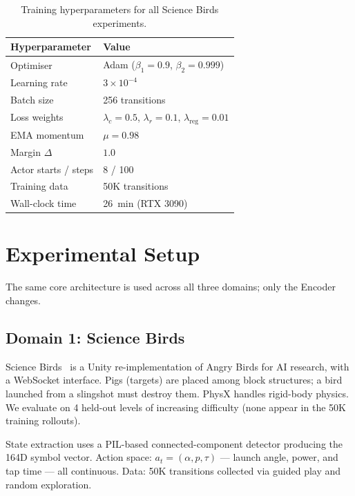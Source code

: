 \documentclass[10pt,twocolumn]{article}
\begin{document}
\begin{table}[h]
\centering
\small
\setlength{\tabcolsep}{5pt}
\begin{tabular}{ll}
\toprule
Hyperparameter & Value \\
\midrule
Optimiser & Adam ($\beta_1{=}0.9$, $\beta_2{=}0.999$) \\
Learning rate & $3 \times 10^{-4}$ \\
Batch size & 256 transitions \\
Loss weights & $\lambda_c{=}0.5$, $\lambda_r{=}0.1$, $\lambda_\text{reg}{=}0.01$ \\
EMA momentum & $\mu = 0.98$ \\
Margin $\Delta$ & $1.0$ \\
Actor starts / steps & 8 / 100 \\
Training data & 50K transitions \\
Wall-clock time & 26~min (RTX 3090) \\
\bottomrule
\end{tabular}
\caption{Training hyperparameters for all Science Birds experiments.}
\label{tab:hparams}
\end{table}

\section{Experimental Setup}
\label{sec:setup}

The same core architecture is used across all three domains; only the Encoder changes.

\subsection{Domain 1: Science Birds}

Science Birds~\citep{renz2019sciencebirds} is a Unity re-implementation of Angry Birds
for AI research, with a WebSocket interface. Pigs (targets) are placed among block
structures; a bird launched from a slingshot must destroy them. PhysX handles rigid-body
physics. We evaluate on 4 held-out levels of increasing difficulty (none appear in the 50K training rollouts).

State extraction uses a PIL-based connected-component detector producing the 164D symbol
vector. Action space: $a_t = (\alpha, p, \tau)$ — launch angle, power, and tap time —
all continuous. Data: 50K transitions collected via guided play and random exploration.
\end{document}
